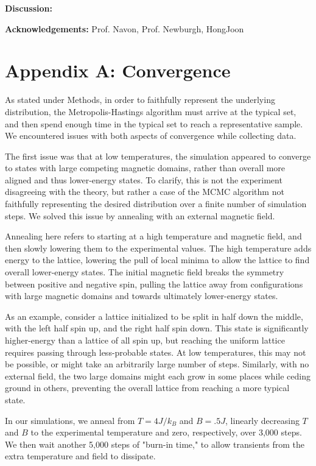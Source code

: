 \documentclass[letter,scriptaddress,twocolumn, prl,nofootinbib]{revtex4}
\begin{document}
\textbf{Discussion:}

\textbf{Acknowledgements:}
	Prof. Navon, Prof. Newburgh, HongJoon
	
 


\appendix
\section{Appendix A: Convergence}

As stated under Methods, in order to faithfully represent the underlying distribution, the Metropolis-Hastings algorithm must arrive at the typical set, and then spend enough time in the typical set to reach a representative sample. We encountered issues with both aspects of convergence while collecting data.

The first issue was that at low temperatures, the simulation appeared to converge to states with large competing magnetic domains, rather than overall more aligned and thus lower-energy states. To clarify, this is not the experiment disagreeing with the theory, but rather a case of the MCMC algorithm not faithfully representing the desired distribution over a finite number of simulation steps. We solved this issue by annealing with an external magnetic field.

Annealing here refers to starting at a high temperature and magnetic field, and then slowly lowering them to the experimental values. The high temperature adds energy to the lattice, lowering the pull of local minima to allow the lattice to find overall lower-energy states. The initial magnetic field breaks the symmetry between positive and negative spin, pulling the lattice away from configurations with large magnetic domains and towards ultimately lower-energy states. 

As an example, consider a lattice initialized to be split in half down the middle, with the left half spin up, and the right half spin down. This state is significantly higher-energy than a lattice of all spin up, but reaching the uniform lattice requires passing through less-probable states. At low temperatures, this may not be possible, or might take an arbitrarily large number of steps. Similarly, with no external field, the two large domains might each grow in some places while ceding ground in others, preventing the overall lattice from reaching a more typical state.

In our simulations, we anneal from $T = 4 J/k_B$ and $B = .5 J$, linearly decreasing $T$ and $B$ to the experimental temperature and zero, respectively, over 3,000 steps. We then wait another 5,000 steps of "burn-in time," to allow transients from the extra temperature and field to dissipate.
\end{document}
